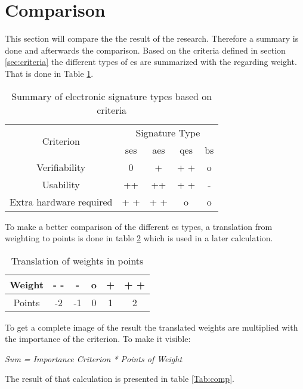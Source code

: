 \section{Comparison} \label{sec:comp}
This section will compare the the result of the research. Therefore a summary is done and afterwards the comparison.
Based on the criteria defined in section \ref{sec:criteria} the different types of \gls{es} are summarized with the regarding weight. That is done in Table \ref{Tab:summary}.

\begin{table}[h]
	\begin{tabular}{|c|c|c|c|c|} \hline
		\multirow{2}{*}{Criterion} & \multicolumn{4}{|c|}{Signature Type} \\
								   & \gls{ses} & \gls{aes} & \gls{qes} & \gls{bs} \\ \cline{1-5}
		Verifiability & 0 & + & + + & o \\ \hline
		Usability & ++ & ++ & + + & - \\ \hline
		Extra hardware required & + + & + + & o & o \\ \hline
	\end{tabular}
	\centering
	\caption{Summary of electronic signature types based on criteria}
	\label{Tab:summary}
\end{table}

To make a better comparison of the different \gls{es} types, a translation from weighting to points is done in table \ref{Tab:Translation} which is used in a later calculation.

\begin{table}[h]
	\begin{tabular}{|c|c|c|c|c|c|} \hline
		Weight & - - & - & o & + & + + \\ \hline
		Points & -2 & -1 & 0 & 1 & 2 \\ \hline
	\end{tabular}
	\centering
	\caption{Translation of weights in points}
	\label{Tab:Translation}
\end{table}

To get a complete image of the result the translated weights are multiplied with the importance of the criterion. To make it visible:
\begin{center}
	\textit{Sum = Importance Criterion * Points of Weight}
\end{center}
The result of that calculation is presented in table \ref{Tab:comp}.


